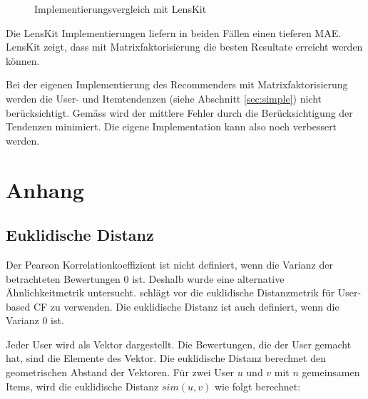 \documentclass[a4paper, 12pt]{article}
\begin{document}
\begin{figure}
  \centering
{} 
  
  \caption{Implementierungsvergleich mit LensKit}
  \label{fig:compareimpl}
\end{figure}

Die LensKit Implementierungen liefern in beiden Fällen einen tieferen MAE. LensKit zeigt, dass mit Matrixfaktorisierung die besten Resultate erreicht werden können. 

Bei der eigenen Implementierung des Recommenders mit Matrixfaktorisierung werden die User- und Itemtendenzen (siehe Abschnitt \ref{sec:simple}) nicht berücksichtigt. Gemäss \cite{koren2009} wird der mittlere Fehler durch die Berücksichtigung der Tendenzen minimiert. Die eigene Implementation kann also noch verbessert werden.

\section{Anhang}

\subsection{Euklidische Distanz}
\label{sec:euclid}

Der Pearson Korrelationkoeffizient ist nicht definiert, wenn die Varianz der betrachteten Bewertungen 0 ist. Deshalb wurde eine alternative Ähnlichkeitmetrik untersucht. \cite{segaran} schlägt vor die euklidische Distanzmetrik für User-based CF zu verwenden. Die euklidische Distanz ist auch definiert, wenn die Varianz 0 ist.

Jeder User wird als Vektor dargestellt. Die Bewertungen, die der User gemacht hat, sind die Elemente des Vektor. Die euklidische Distanz berechnet den geometrischen Abstand der Vektoren. Für zwei User $u$ und $v$ mit $n$ gemeinsamen Items, wird die euklidische Distanz $sim(u,v)$ wie folgt berechnet:
\end{document}
